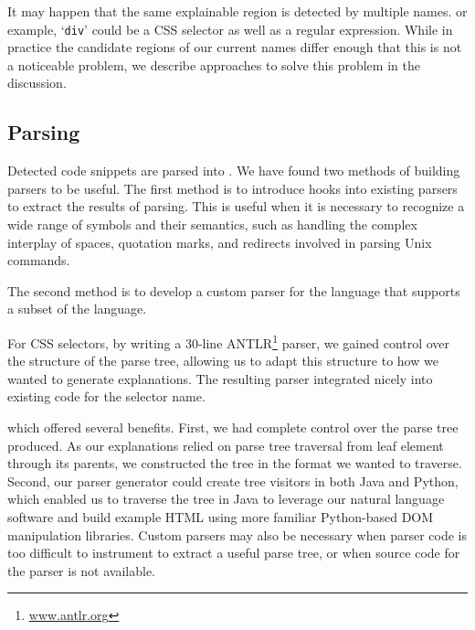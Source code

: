 \begin{changes}
It may happen that the same explainable region is detected by multiple \Glspl{name}.
or example, `\texttt{div}' could be a CSS selector as well as a regular expression.
While in practice the candidate regions of our current \Glspl{name} differ enough that this is not a noticeable problem, we describe approaches to solve this problem in the discussion.
\end{changes}

\subsection{Parsing}
Detected code snippets are parsed into .
We have found two methods of building parsers to be useful. The first method is to introduce hooks into existing parsers to extract the results of parsing.  This is useful 
when it is necessary to recognize a wide range of symbols and their semantics, %
such as handling the complex interplay of spaces, quotation marks, and redirects involved in parsing Unix commands.

The second method is to develop a custom parser for the language that supports a subset of the language.
\begin{changes}
For CSS selectors, by writing a 30-line ANTLR\footnote{\url{www.antlr.org}} parser, we gained control over the structure of the parse tree, allowing us to adapt this structure to how we wanted to generate explanations.
The resulting parser integrated nicely into existing code for the selector \Gls{name}.
\end{changes}
which offered several benefits.
First, we had complete control over the parse tree produced.
As our explanations relied on parse tree traversal from leaf element through its parents, we constructed the tree in the format we wanted to traverse.
Second, our parser generator could create tree visitors in both Java and Python, which enabled us to traverse the tree in Java to leverage our natural language software and build example HTML using more familiar Python-based DOM manipulation libraries.
Custom parsers may also be necessary when parser code is too difficult to instrument to extract a useful parse tree, or when source code for the parser is not available.
\fi

